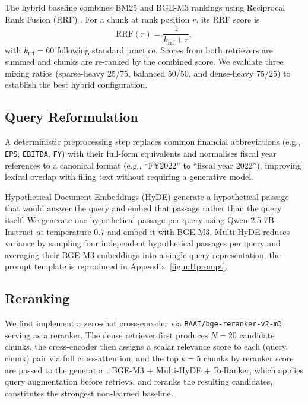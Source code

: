 \documentclass[12pt,twoside,maitrise]{dms}
\theoremstyle{definition}
\numberwithin{equation}{section}
\numberwithin{table}{chapter}
\numberwithin{figure}{chapter}
\begin{document}
The hybrid baseline combines BM25 and BGE-M3 rankings using Reciprocal Rank Fusion
(RRF) \citep{cormack2009reciprocal}. For a chunk at rank position $r$, its RRF score is
\begin{equation}
  \text{RRF}(r) = \frac{1}{k_{\text{rrf}} + r},
\end{equation}
with $k_{\text{rrf}} = 60$ following standard practice. Scores from both retrievers are
summed and chunks are re-ranked by the combined score. We evaluate three mixing ratios
(sparse-heavy 25/75, balanced 50/50, and dense-heavy 75/25) to establish the best
hybrid configuration.

\subsection{Query Reformulation}

A deterministic preprocessing step replaces common financial abbreviations
(e.g., \texttt{EPS}, \texttt{EBITDA}, \texttt{FY}) with their full-form equivalents
and normalises fiscal year references to a canonical format (e.g., ``FY2022'' to
``fiscal year 2022''), improving lexical overlap with filing text without requiring a
generative model.

Hypothetical Document Embeddings (HyDE) \citep{gao2023precise} generate a hypothetical
passage that would answer the query and embed that passage rather than the query itself.
We generate one hypothetical passage per query using Qwen-2.5-7B-Instruct at temperature
$0.7$ and embed it with BGE-M3. Multi-HyDE \citep{george2025enhancing} reduces variance
by sampling four independent hypothetical passages per query and averaging their BGE-M3
embeddings into a single query representation; the prompt template is reproduced in
Appendix~\ref{fig:mHprompt}.

\subsection{Reranking}
\label{sec:reranking}

We first implement a zero-shot cross-encoder via \texttt{BAAI/bge-reranker-v2-m3} serving as a reranker. The
dense retriever first produces $N=20$ candidate chunks, the cross-encoder then assigns a
scalar relevance score to each (query, chunk) pair via full cross-attention, and the
top $k=5$ chunks by reranker score are passed to the generator
\citep{nogueira2019document}. BGE-M3 + Multi-HyDE + ReRanker, which applies query
augmentation before retrieval and reranks the resulting candidates, constitutes the
strongest non-learned baseline.
\end{document}
